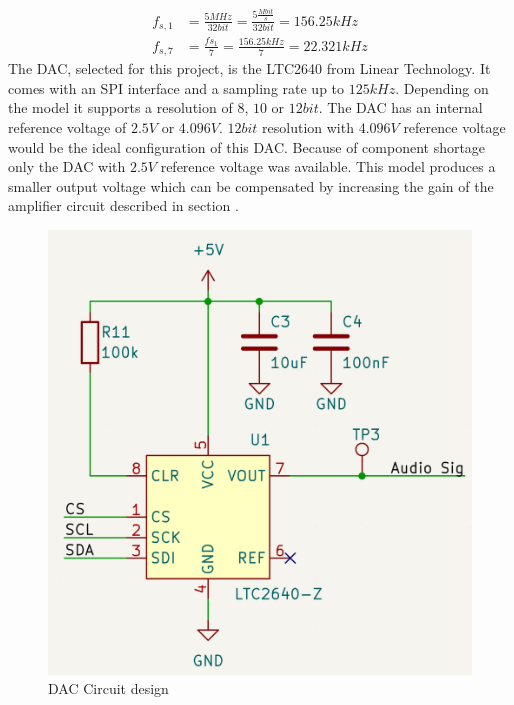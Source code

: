 %
\begin{align}
  f_{s,1} &= \frac{5MHz}{32bit} = \frac{5 \frac{Mbit}{s}}{32bit} = 156.25kHz \label{eq:pcb:dac_fs}\\[1em]
  f_{s, 7} &= \frac{fs_1}{7} = \frac{156.25kHz}{7} = 22.321kHz
\end{align}
%
The DAC, selected for this project, is the LTC2640 from Linear Technology. It comes with an SPI interface and a sampling rate up to $125kHz$. Depending on the model it supports a resolution of $8$, $10$ or $12bit$. The DAC has an internal reference voltage of $2.5V$ or $4.096V$. $12bit$ resolution with $4.096V$ reference voltage would be the ideal configuration of this DAC. Because of component shortage only the DAC with $2.5V$ reference voltage was available. This model produces a smaller output voltage which can be compensated by increasing the gain of the amplifier circuit described in section .\cite{linear_technology_ltc2640_2017}
%
\begin{figure}
  \centering
  \includegraphics[height=\mediumheight]{src/assets/pictures/circuit/dac_circuit.png}
  \caption{DAC Circuit design}\label{fig:pcb:dac_circuit}
\end{figure}